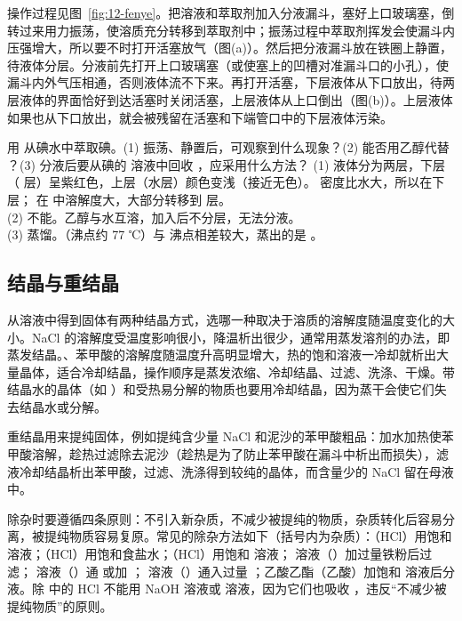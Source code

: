 操作过程见图~\ref{fig:12-fenye}。把溶液和萃取剂加入分液漏斗，塞好上口玻璃塞，倒转过来用力振荡，使溶质充分转移到萃取剂中；振荡过程中萃取剂挥发会使漏斗内压强增大，所以要不时打开活塞放气（图(a)）。然后把分液漏斗放在铁圈上静置，待液体分层。分液前先打开上口玻璃塞（或使塞上的凹槽对准漏斗口的小孔），使漏斗内外气压相通，否则液体流不下来。再打开活塞，下层液体从下口放出，待两层液体的界面恰好到达活塞时关闭活塞，上层液体从上口倒出（图(b)）。上层液体如果也从下口放出，就会被残留在活塞和下端管口中的下层液体污染。

\begin{liti}[基础]
用  从碘水中萃取碘。(1) 振荡、静置后，可观察到什么现象？(2) 能否用乙醇代替 ？(3) 分液后要从碘的  溶液中回收 ，应采用什么方法？
\tcblower
\jie (1) 液体分为两层，下层（ 层）呈紫红色，上层（水层）颜色变浅（接近无色）。 密度比水大，所以在下层； 在  中溶解度大，大部分转移到  层。\\
(2) 不能。乙醇与水互溶，加入后不分层，无法分液。\\
(3) 蒸馏。（沸点约 77 ℃）与  沸点相差较大，蒸出的是 。
\end{liti}

\subsection{结晶与重结晶}

从溶液中得到固体有两种结晶方式，选哪一种取决于溶质的溶解度随温度变化的大小。NaCl 的溶解度受温度影响很小，降温析出很少，通常用蒸发溶剂的办法，即蒸发结晶。、苯甲酸的溶解度随温度升高明显增大，热的饱和溶液一冷却就析出大量晶体，适合冷却结晶，操作顺序是蒸发浓缩、冷却结晶、过滤、洗涤、干燥。带结晶水的晶体（如 ）和受热易分解的物质也要用冷却结晶，因为蒸干会使它们失去结晶水或分解。

重结晶用来提纯固体，例如提纯含少量 NaCl 和泥沙的苯甲酸粗品：加水加热使苯甲酸溶解，趁热过滤除去泥沙（趁热是为了防止苯甲酸在漏斗中析出而损失），滤液冷却结晶析出苯甲酸，过滤、洗涤得到较纯的晶体，而含量少的 NaCl 留在母液中。

除杂时要遵循四条原则：不引入新杂质，不减少被提纯的物质，杂质转化后容易分离，被提纯物质容易复原。常见的除杂方法如下（括号内为杂质）：（HCl）用饱和  溶液；（HCl）用饱和食盐水；（HCl）用饱和  溶液； 溶液（）加过量铁粉后过滤； 溶液（）通  或加 ； 溶液（）通入过量 ；乙酸乙酯（乙酸）加饱和  溶液后分液。除  中的 HCl 不能用 NaOH 溶液或  溶液，因为它们也吸收 ，违反“不减少被提纯物质”的原则。

